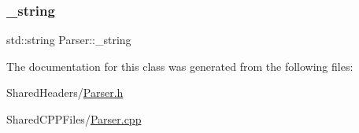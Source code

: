 \subsubsection{\texorpdfstring{\+\_\+string}{\_string}}
{\footnotesize\ttfamily std\+::string Parser\+::\+\_\+string\hspace{0.3cm}{\ttfamily [private]}}



The documentation for this class was generated from the following files\+:\begin{DoxyCompactItemize}
\item 
Shared\+Headers/\mbox{\hyperlink{_parser_8h}{Parser.\+h}}\item 
Shared\+C\+P\+P\+Files/\mbox{\hyperlink{_parser_8cpp}{Parser.\+cpp}}\end{DoxyCompactItemize}
